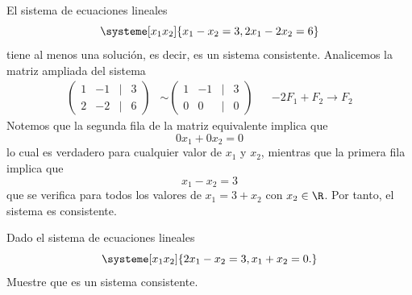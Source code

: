 \documentclass[compacto,10pt]{pubciencias-notas}
\begin{document}
\begin{ejem}\hspace{0pt} 
El sistema de ecuaciones lineales
\[
    \systeme[x_1 x_2]{x_1 -x_2 = 3,
        2x_1 -2x_2 = 6}
\]
tiene al menos una solución, es decir, es un sistema consistente. Analicemos la matriz ampliada del sistema
\begin{align*}
    \begin{pmatrix}
    1&-1&|&3\\
    2&-2&|&6
    \end{pmatrix}
    &\sim
    \begin{pmatrix}
    1&-1&|&3\\
    0&0&|&0
    \end{pmatrix} 
    && -2F_{1} + F_{2} \to F_{2}
\end{align*}
Notemos que la segunda fila de la matriz equivalente implica que
\[
    0x_{1} + 0x_{2} = 0
\]
lo cual es verdadero para cualquier valor de $x_{1}$ y $x_{2}$, mientras que la primera fila implica que
\[
    x_{1} - x_{2} = 3
\]
que se verifica para todos los valores de $x_{1} = 3 + x_{2}$ con $x_{2}\in\R$. Por tanto, el sistema es consistente.
\end{ejem}

\begin{ejer}\hspace{0pt} 
Dado el sistema de ecuaciones lineales
\[
    \systeme[x_1 x_2]{2x_1 -x_2 = 3,
        x_1 +x_2 = 0.}
\]
Muestre que es un sistema consistente.
\end{ejer}
\end{document}
